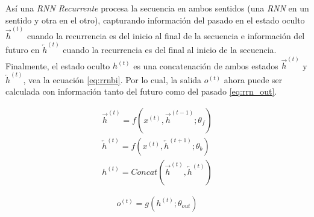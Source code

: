 Así una \textit{RNN Recurrente}  procesa la secuencia en ambos sentidos (una \textit{RNN} en un
sentido y otra en el otro), capturando información del
pasado en el estado oculto $\overrightarrow{h}^{(t)}$  cuando la recurrencia es del inicio al final
de la secuencia e información del futuro en $\overleftarrow{h}  ^{(t)}$ cuando la recurrencia es del
final al inicio de la secuencia. Finalmente, el estado oculto $h^{(t)}$ es una concatenación de ambos
estados $\overrightarrow{h}^{(t)}$ y $\overleftarrow{h}^{(t)}$, vea la ecuación \ref{eq:rrnbi}.
Por lo cual, la salida $o^{(t)}$ ahora puede ser calculada con información tanto del futuro como del pasado
\ref{eq:rrn_out}.

\begin{equation}
\begin{split}
    \overrightarrow{h}^{(t)} = f(x^{(t)}, \overrightarrow{h}^{(t-1)}; \theta_f)\\
    \overleftarrow{h}^{(t)} = f(x^{(t)}, \overleftarrow{h}^{(t+1)}; \theta_b)\\
    h^{(t)} = Concat(\overrightarrow{h}^{(t)}, \overleftarrow{h}^{(t)})
\end{split}
\label{eq:rrnbi}
\end{equation}

\begin{equation}
        o^{(t)} = g(h^{(t)}; \theta_{out})
\label{eq:rrn_out}
\end{equation}
